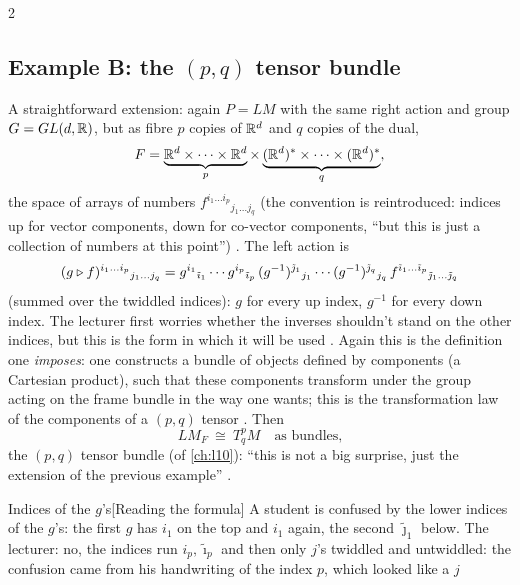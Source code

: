 \begin{paracol}{2}
\subsection{Example B: the $(p,q)$ tensor bundle}\label{sec:ab-tensor}
A straightforward extension: again $P=LM$ with the same right action and group $G=GL(d,\mathbb{R})$, but as fibre $p$ copies of $\mathbb{R}^d$ and $q$ copies of the dual,
\[
  F=\underbrace{\mathbb{R}^d\times\dots\times\mathbb{R}^d}_{p}\times\underbrace{(\mathbb{R}^d)^*\times\dots\times(\mathbb{R}^d)^*}_{q} ,
\]
the space of arrays of numbers $f^{i_1\dots i_p}{}_{j_1\dots j_q}$ (the convention is reintroduced: indices up for vector components, down for co-vector components, ``but this is just a collection of numbers at this point'')        . The left action is
\[
  (g\mathbin{\triangleright} f)^{i_1\dots i_p}{}_{j_1\dots j_q}=g^{i_1}{}_{\tilde\imath_1}\cdots g^{i_p}{}_{\tilde\imath_p}\,(g^{-1})^{\tilde\jmath_1}{}_{j_1}\cdots(g^{-1})^{\tilde\jmath_q}{}_{j_q}\,f^{\tilde\imath_1\dots\tilde\imath_p}{}_{\tilde\jmath_1\dots\tilde\jmath_q}
\]
(summed over the twiddled indices): $g$ for every up index, $g^{-1}$ for every down index. The lecturer first worries whether the inverses shouldn't stand on the other indices, but this is the form in which it will be used     . Again this is the definition one \emph{imposes}: one constructs a bundle of objects defined by components (a Cartesian product), such that these components transform under the group acting on the frame bundle in the way one wants; this is the transformation law of the components of a $(p,q)$ tensor   . Then
\[
  LM_F\ \cong\ T^p_qM\quad\text{as bundles,}
\]
the $(p,q)$ tensor bundle (of \cref{ch:l10}): ``this is not a big surprise, just the extension of the previous example''   .
\begin{answer}{Indices of the $g$'s}[Reading the formula]
A student is confused by the lower indices of the $g$'s: the first $g$ has $i_1$ on the top and $i_1$ again, the second $\tilde\jmath_1$ below. The lecturer: no, the indices run $i_p,\tilde\imath_p$ and then only $j$'s twiddled and untwiddled: the confusion came from his handwriting of the index $p$, which looked like a $j$    
\end{answer}

\end{paracol}
